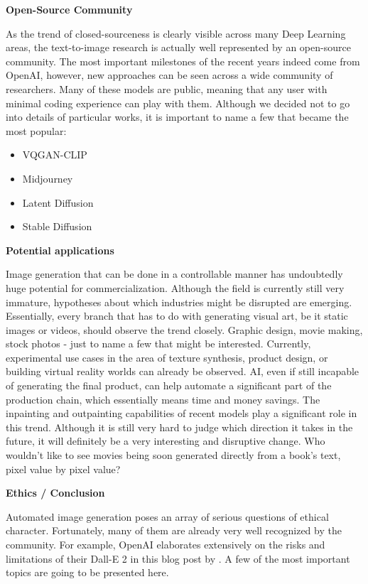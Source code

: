 \documentclass[
]{krantz}
\providecommand{\tightlist}{%
  \setlength{\itemsep}{0pt}\setlength{\parskip}{0pt}}
\begin{document}
\textbf{Open-Source Community}

As the trend of closed-sourceness is clearly visible across many Deep Learning areas, the text-to-image research is actually well represented by an open-source community. The most important milestones of the recent years indeed come from OpenAI, however, new approaches can be seen across a wide community of researchers. Many of these models are public, meaning that any user with minimal coding experience can play with them. Although we decided not to go into details of particular works, it is important to name a few that became the most popular:

\begin{itemize}
\tightlist
\item
  VQGAN-CLIP \citep{VQGANCLIP2022}
\item
  Midjourney \citep{Midjourney}
\item
  Latent Diffusion \citep{LatentDiffusion2021}
\item
  Stable Diffusion \citep{StableDiffusion2022}
\end{itemize}

\textbf{Potential applications}

Image generation that can be done in a controllable manner has undoubtedly huge potential for commercialization. Although the field is currently still very immature, hypotheses about which industries might be disrupted are emerging. Essentially, every branch that has to do with generating visual art, be it static images or videos, should observe the trend closely. Graphic design, movie making, stock photos - just to name a few that might be interested. Currently, experimental use cases in the area of texture synthesis, product design, or building virtual reality worlds can already be observed. AI, even if still incapable of generating the final product, can help automate a significant part of the production chain, which essentially means time and money savings. The inpainting and outpainting capabilities of recent models play a significant role in this trend. Although it is still very hard to judge which direction it takes in the future, it will definitely be a very interesting and disruptive change. Who wouldn't like to see movies being soon generated directly from a book's text, pixel value by pixel value?

\textbf{Ethics / Conclusion}

Automated image generation poses an array of serious questions of ethical character. Fortunately, many of them are already very well recognized by the community. For example, OpenAI elaborates extensively on the risks and limitations of their Dall-E 2 in this blog post by \citet{mishkin2022risks}. A few of the most important topics are going to be presented here.
\end{document}
